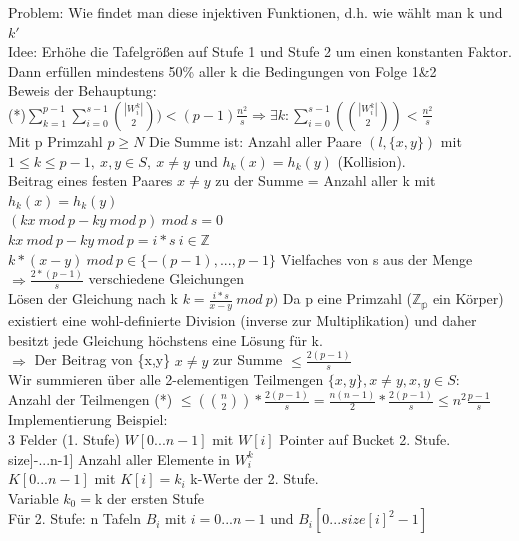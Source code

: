 \documentclass[a4paper]{article}
\begin{document}
Problem: Wie findet man diese injektiven Funktionen, d.h. wie wählt man k und $k'$\\
Idee: Erhöhe die Tafelgrößen auf Stufe 1 und Stufe 2 um einen konstanten Faktor. Dann erfüllen mindestens 50\% aller k die Bedingungen von Folge 1\&2\\
Beweis der Behauptung:\\
(*)$\sum_{k=1}^{p-1}\sum_{i=0}^{s-1} {|W_i^k| \choose 2})<(p-1)\frac{n^2}{s}\Rightarrow \exists k:\sum_{i=0}^{s-1}({|W_i^k| \choose 2})<\frac{n^2}{s}$\\
Mit p Primzahl $p\geq N$
Die Summe ist: Anzahl aller Paare $(l,\{x,y\})$ mit $1\leq k \leq p-1,\ x,y\in S,\ x\neq y$ und $h_k(x) = h_k(y)$ (Kollision).\\
Beitrag eines festen Paares $x\neq y$ zu der Summe = Anzahl aller k mit $h_k(x)=h_k(y)$\\
$(kx\ mod\ p-ky\ mod\ p)\ mod\ s = 0$\\
$kx\ mod\ p-ky\ mod\ p = i*s\ i\in \mathbb{Z}$\\
$k*(x-y)\ mod\ p\in \{-(p-1),...,p-1\}$ Vielfaches von s aus der Menge $\Rightarrow \frac{2*(p-1)}{s}$ verschiedene Gleichungen\\
Lösen der Gleichung nach k $k=\frac{i*s}{x-y}\ mod\ p)$ Da p eine Primzahl ($\mathbb{Z_p}$ ein Körper) existiert eine wohl-definierte Division (inverse zur Multiplikation) und daher besitzt jede Gleichung höchstens eine Lösung für k.\\
$\Rightarrow$ Der Beitrag von \{x,y\} $x\neq y$ zur Summe $\leq \frac{2(p-1)}{s}$\\
Wir summieren über  alle 2-elementigen Teilmengen $\{x,y\}, x\neq y, x,y\in S$:\\
Anzahl der Teilmengen (*) $\leq ({n \choose 2}) * \frac{2(p-1)}{s}=\frac{n(n-1)}{2}*\frac{2(p-1)}{s}\leq n^2\frac{p-1}{s}$\\
Implementierung Beispiel:\\
3 Felder (1. Stufe) $W[0...n-1]$ mit $W[i]$ Pointer auf Bucket 2. Stufe.\\
\hspace*{1cm}size]-...n-1] Anzahl aller Elemente in $W_i^k$\\
\hspace*{1cm} $K[0...n-1]$ mit $K[i]=k_i$ k-Werte der 2. Stufe.\\
\hspace*{1cm} Variable $k_0 = $k der ersten Stufe\\
Für 2. Stufe: n Tafeln $B_i$ mit $i=0...n-1$ und $B_i[0...size[i]^2-1]$\\
\end{document}
